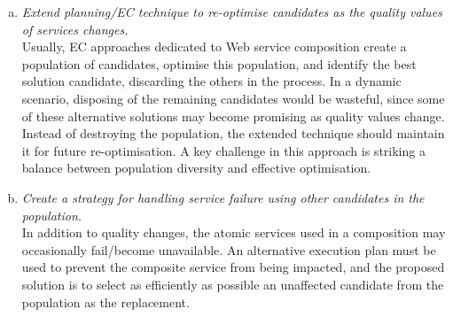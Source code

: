 \begin{enumerate}
 \begin{enumerate}[(a)]
 \item \label{obj:dyna-qos} \textit{Extend planning/EC technique to re-optimise candidates as the quality values of services changes.}\\
 Usually, EC approaches dedicated to Web service composition create a population of candidates, optimise this population, and identify the best solution candidate, discarding the others in the process. In a dynamic scenario, disposing of the remaining candidates would be wasteful, since some of these alternative solutions may become promising as quality values change. Instead of destroying the population, the extended technique should maintain it for future re-optimisation. A key challenge in this approach is striking a balance between population diversity and effective optimisation.
 \item \label{obj:dyna-fail} \textit{Create a strategy for handling service failure using other candidates in the population.}\\
 In addition to quality changes, the atomic services used in a composition may occasionally fail/become unavailable. An alternative execution plan must be used to prevent the composite service from being impacted, and the proposed solution is to select as efficiently as possible an unaffected candidate from the population as the replacement.
 \end{enumerate}
 
\end{enumerate}





